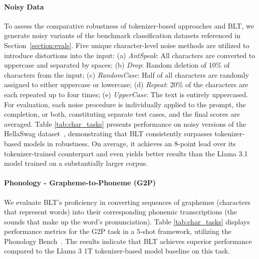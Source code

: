 \paragraph{Noisy Data} To assess the comparative robustness of tokenizer-based approaches and {\textsc BLT}, we generate noisy variants of the benchmark classification datasets referenced in Section~\ref{section:evals}. Five unique character-level noise methods are utilized to introduce distortions into the input: (a) \textit{AntSpeak}: All characters are converted to uppercase and separated by spaces; (b) \textit{Drop}: Random deletion of 10\% of characters from the input; (c) \textit{RandomCase}: Half of all characters are randomly assigned to either uppercase or lowercase; (d) \textit{Repeat}: 20\% of the characters are each repeated up to four times; (e) \textit{UpperCase}: The text is entirely uppercased. For evaluation, each noise procedure is individually applied to the prompt, the completion, or both, constituting separate test cases, and the final scores are averaged. Table \ref{tab:char_tasks} presents performance on noisy versions of the HellaSwag dataset~\citep{Eval_hellaswag}, demonstrating that {\textsc BLT} consistently surpasses tokenizer-based models in robustness. On average, it achieves an 8-point lead over its tokenizer-trained counterpart and even yields better results than the Llama 3.1 model trained on a substantially larger corpus.

\paragraph{Phonology - Grapheme-to-Phoneme (G2P)} We evaluate {\textsc BLT}'s proficiency in converting sequences of graphemes (characters that represent words) into their corresponding phonemic transcriptions (the sounds that make up the word’s pronunciation). Table \ref{tab:char_tasks} displays performance metrics for the G2P task in a 5-shot framework, utilizing the Phonology Bench~\citep{suvarna2024phonologybench}. The results indicate that {\textsc BLT} achieves superior performance compared to the Llama 3 1T tokenizer-based model baseline on this task.

